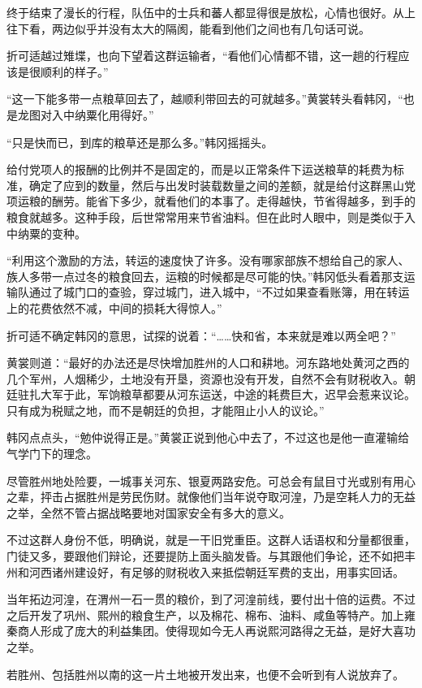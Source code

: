 终于结束了漫长的行程，队伍中的士兵和蕃人都显得很是放松，心情也很好。从上往下看，两边似乎并没有太大的隔阂，能看到他们之间也有几句话可说。

折可适越过雉堞，也向下望着这群运输者，“看他们心情都不错，这一趟的行程应该是很顺利的样子。”

“这一下能多带一点粮草回去了，越顺利带回去的可就越多。”黄裳转头看韩冈，“也是龙图对入中纳粟化用得好。”

“只是快而已，到库的粮草还是那么多。”韩冈摇摇头。

给付党项人的报酬的比例并不是固定的，而是以正常条件下运送粮草的耗费为标准，确定了应到的数量，然后与出发时装载数量之间的差额，就是给付这群黑山党项运粮的酬劳。能省下多少，就看他们的本事了。走得越快，节省得越多，到手的粮食就越多。这种手段，后世常常用来节省油料。但在此时人眼中，则是类似于入中纳粟的变种。

“利用这个激励的方法，转运的速度快了许多。没有哪家部族不想给自己的家人、族人多带一点过冬的粮食回去，运粮的时候都是尽可能的快。”韩冈低头看着那支运输队通过了城门口的查验，穿过城门，进入城中，“不过如果查看账簿，用在转运上的花费依然不减，中间的损耗大得惊人。”

折可适不确定韩冈的意思，试探的说着：“……快和省，本来就是难以两全吧？”

黄裳则道：“最好的办法还是尽快增加胜州的人口和耕地。河东路地处黄河之西的几个军州，人烟稀少，土地没有开垦，资源也没有开发，自然不会有财税收入。朝廷驻扎大军于此，军饷粮草都要从河东运送，中途的耗费巨大，迟早会惹来议论。只有成为税赋之地，而不是朝廷的负担，才能阻止小人的议论。”

韩冈点点头，“勉仲说得正是。”黄裳正说到他心中去了，不过这也是他一直灌输给气学门下的理念。

尽管胜州地处险要，一城事关河东、银夏两路安危。可总会有鼠目寸光或别有用心之辈，抨击占据胜州是劳民伤财。就像他们当年说夺取河湟，乃是空耗人力的无益之举，全然不管占据战略要地对国家安全有多大的意义。

不过这群人身份不低，明确说，就是一干旧党重臣。这群人话语权和分量都很重，门徒又多，要跟他们辩论，还要提防上面头脑发昏。与其跟他们争论，还不如把丰州和河西诸州建设好，有足够的财税收入来抵偿朝廷军费的支出，用事实回话。

当年拓边河湟，在渭州一石一贯的粮价，到了河湟前线，要付出十倍的运费。不过之后开发了巩州、熙州的粮食生产，以及棉花、棉布、油料、咸鱼等特产。加上雍秦商人形成了庞大的利益集团。使得现如今无人再说熙河路得之无益，是好大喜功之举。

若胜州、包括胜州以南的这一片土地被开发出来，也便不会听到有人说放弃了。

